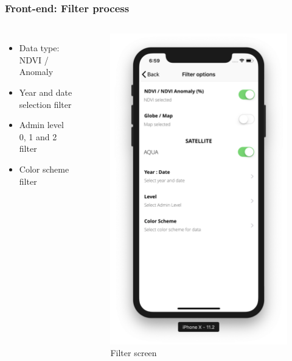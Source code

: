 \begin{frame}
\frametitle{Front-end: Filter process}
\begin{columns}

 \begin{itemize}
       \item Data type: NDVI / Anomaly
       \item Year and date selection filter
       \item Admin level 0, 1 and 2 filter
       \item Color scheme filter
   \end{itemize}

\begin{figure}
    \centering
    \begin{minipage}{.5\columnwidth}
    \includegraphics[width=\linewidth]{final/figures/filter.png}
    \caption{Filter screen}
    \end{minipage}
\end{figure}
\end{columns}
\end{frame}



